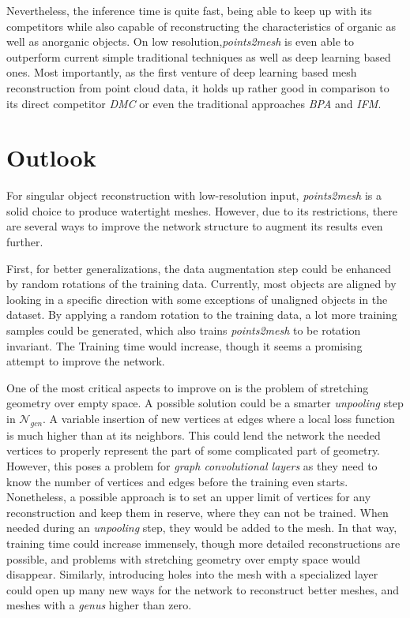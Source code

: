   Nevertheless, the inference time is quite fast, being able to keep up with its competitors while also capable of reconstructing
  the characteristics of organic as well as anorganic objects. On low resolution,\emph{points2mesh} is even able to outperform current
  simple traditional techniques as well as deep learning based ones. Most importantly, as the first venture of deep learning based mesh reconstruction 
  from point cloud data, it holds up rather good in comparison to its direct competitor \emph{DMC} or even the traditional approaches \emph{BPA} and \emph{IFM}.



\section{Outlook}
\label{outlook}
  For singular object reconstruction with low-resolution input, \emph{points2mesh} is a solid choice to produce watertight meshes. However, 
  due to its restrictions, there are several ways to improve the network structure to augment its results even further.

  First, for better generalizations, the data augmentation step could be enhanced by random rotations of the training data. Currently, 
  most objects are aligned by looking in a specific direction with some exceptions of unaligned objects in the dataset. By applying a
  random rotation to the training data, a lot more training samples could be generated, which also trains \emph{points2mesh} to be rotation
  invariant. The Training time would increase, though it seems a promising attempt to improve the network.

  One of the most critical aspects to improve on is the problem of stretching geometry over empty space. A possible solution could be a smarter
  \emph{unpooling} step in $\mathcal{N}_{gcn}$. A variable insertion of new vertices at edges where a local loss function is much higher than 
  at its neighbors. This could lend the network the needed vertices to properly represent the part of some complicated part of geometry. However,
  this poses a problem for \emph{graph convolutional layers} as they need to know the number of vertices and edges before the training even starts.
  Nonetheless, a possible approach is to set an upper limit of vertices for any reconstruction and keep them in reserve, where they can not be trained.
  When needed during an \emph{unpooling} step, they would be added to the mesh. In that way, training time could increase immensely, though more detailed 
  reconstructions are possible, and problems with stretching geometry over empty space would disappear. Similarly, introducing holes into the mesh with a 
  specialized layer could open up many new ways for the network to reconstruct better meshes, and meshes with a \emph{genus} higher than zero. 

